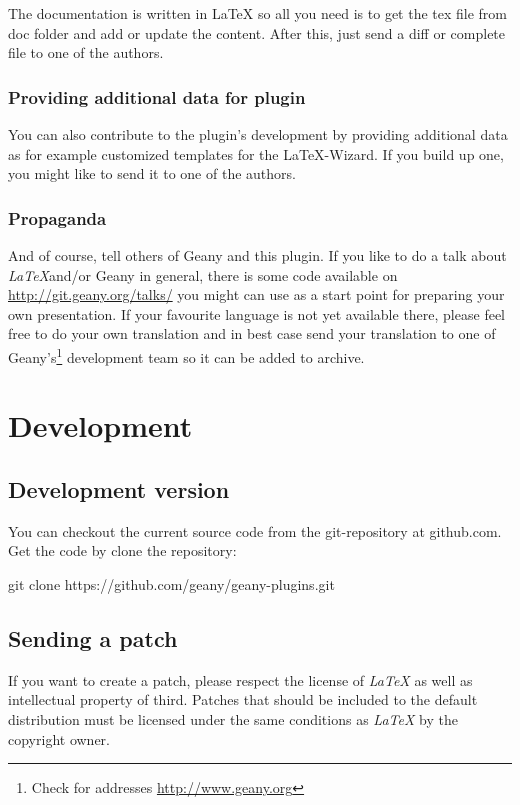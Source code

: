 \documentclass[%
paper=a4,%
fontsize=11pt,%
twoside=false,%
DIV18,%
headsepline,%
plainheadsepline,%
footsepline,%
plainfootsepline,%
bibliography=totoc,%
listof=totoc,%
BCOR10mm,%
parskip=half,%
openany,%
]{scrreprt}
\begin{document}
The documentation is written in \LaTeX{} so all you need is to get the
tex file from doc folder and add or update the content.
After this, just send a diff or complete file to one of the authors.


\subsection{Providing additional data for plugin}

You can also contribute to the plugin's development by providing
additional data as for example customized templates for the
\LaTeX-Wizard. If you build up one, you might like to send it to
one of the authors.

\subsection{Propaganda}
And of course, tell others of Geany and this plugin. If you like to do
a talk about \textit{LaTeX}and/or Geany in general, there is some code
available on \url{http://git.geany.org/talks/} you might can use as a
start point for preparing your own presentation. If your favourite
language is not yet available there, please feel free to do your own
translation and in best case send your translation to one of
Geany's\footnote{Check for addresses \url{http://www.geany.org}}
development team so it can be added to archive.


\chapter{Development}
\section{Development version}
You can checkout the current source code from the git-repository
at github.com. Get the code by clone the repository:

git clone https://github.com/geany/geany-plugins.git

\section{Sending a patch}
\label{sec:sending_a_patch}
If you want to create a patch, please respect the license of
\textit{LaTeX} as well as intellectual property of third. Patches that
should be included to the default distribution must be licensed under
the same conditions as \textit{LaTeX} by the copyright owner.
\end{document}

